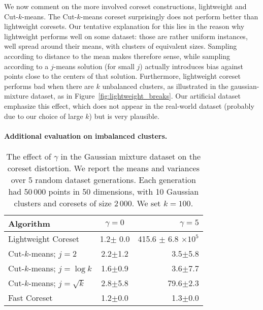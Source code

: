 We now comment on the more involved coreset constructions, lightweight and Cut-$k$-means. The Cut-$k$-means coreset surprisingly does not perform better than
lightweight coresets. Our tentative explanation for this lies in the reason why lightweight performs well on some dataset: those are rather uniform instances, well
spread around their means, with clusters of equivalent sizes.  Sampling according to distance to the mean makes therefore sense,
while sampling according to a $j$-means solution (for small $j$) actually introduces bias against points close to the centers of that solution.  Furthermore,
lightweight coreset performs bad when there are $k$ unbalanced clusters, as illustrated in the gaussian-mixture dataset, as in
Figure~\ref{fig:lightweight_breaks}.  Our artificial dataset emphasize this effect, which does not appear in the real-world dataset (probably due to our choice
of large $k$) but is very plausible.  

\paragraph*{Additional evaluation on imbalanced clusters.}

\begin{table}[htbp]
    \label{tbl:class-imbalance}
    \centering
    \begin{tabular}{lcr}
        Algorithm & $\gamma = 0$ & $\gamma = 5$ \\
        \hline
        Lightweight Coreset & 1.2$\pm$ 0.0 & 415.6 $\pm$ 6.8 $\times 10^5$ \\
        Cut-$k$-means; $j=2$ & 2.2$\pm$1.2 & 3.5$\pm$5.8 \\
        Cut-$k$-means; $j=\log k$ & 1.6$\pm$0.9 & 3.6$\pm$7.7 \\
        Cut-$k$-means; $j=\sqrt{k}$ & 2.8$\pm$5.8 & 79.6$\pm$2.3 \\
        Fast Coreset & 1.2$\pm$0.0 & 1.3$\pm$0.0
    \end{tabular}
    \caption{The effect of $\gamma$ in the Gaussian mixture dataset on the coreset distortion. We report the means and variances over 5 random dataset generations.
    Each generation had 50\,000 points in 50 dimensions, with 10 Gaussian clusters and coresets of size 2\,000. We set $k=100$.}
\end{table}

